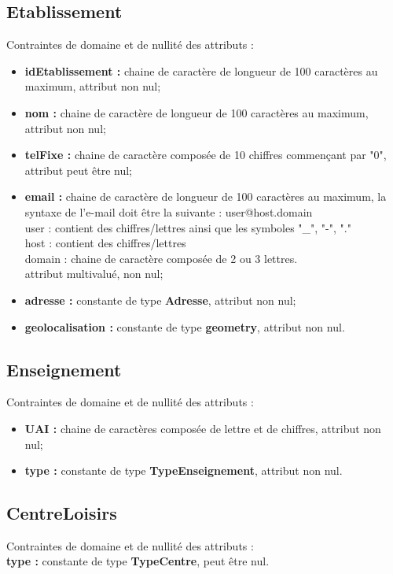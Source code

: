 \documentclass[asi, sansVersion]{picInsa}
\begin{document}
\subsection*{Etablissement}
Contraintes de domaine et de nullité des attributs :
\begin{itemize}
 	\item \textbf{idEtablissement :} chaine de caractère de longueur de 100 caractères au maximum, attribut non nul;
	\item \textbf{nom :} chaine de caractère de longueur de 100 caractères au maximum, attribut non nul;
	\item \textbf{telFixe :} chaine de caractère composée de 10 chiffres commençant par "0", attribut peut être nul;
	\item \textbf{email :} chaine de caractère de longueur de 100 caractères au maximum, la syntaxe de l'e-mail doit être la suivante : user@host.domain\\
	user : contient des chiffres/lettres ainsi que les symboles "\_", "-", "." \\
	host : contient des chiffres/lettres \\
	domain : chaine de caractère composée de 2 ou 3 lettres. \\
	attribut multivalué, non nul; 
	\item \textbf{adresse :} constante de type \textbf{Adresse}, attribut non nul; 
	\item \textbf{geolocalisation :} constante de type \textbf{geometry}, attribut non nul.\\
\end{itemize}  

\subsection*{Enseignement}
Contraintes de domaine et de nullité des attributs :
\begin{itemize}
	\item \textbf{UAI :} chaine de caractères composée de lettre et de chiffres, attribut non nul;
	\item \textbf{type :} constante de type \textbf{TypeEnseignement}, attribut non nul.\\
\end{itemize}

\subsection*{CentreLoisirs}
Contraintes de domaine et de nullité des attributs :\\
\indent \indent \textbf{type :} constante de type \textbf{TypeCentre}, peut être nul.\\
\end{document}
